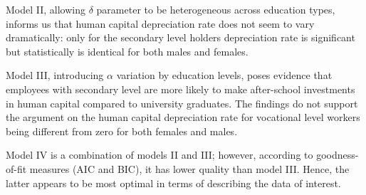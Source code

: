 \documentclass[12pt,a4paper]{article}
\numberwithin{equation}{section}
\begin{document}
Model II, allowing $\delta$ parameter to be heterogeneous across education types, informs us that human capital depreciation rate does not seem to vary dramatically: only for the secondary level holders depreciation rate is significant but statistically is identical for both males and females. 

Model III, introducing $\alpha$ variation by education levels, poses evidence that employees with secondary level are more likely to make after-school investments in human capital compared to university graduates. The findings do not support the argument on the human capital depreciation rate for vocational level workers being different from zero for both females and males.

Model IV is a combination of models II and III; however, according to goodness-of-fit measures (AIC and BIC), it has lower quality than model III. Hence, the latter appears to be most optimal in terms of describing the data of interest.
\end{document}
